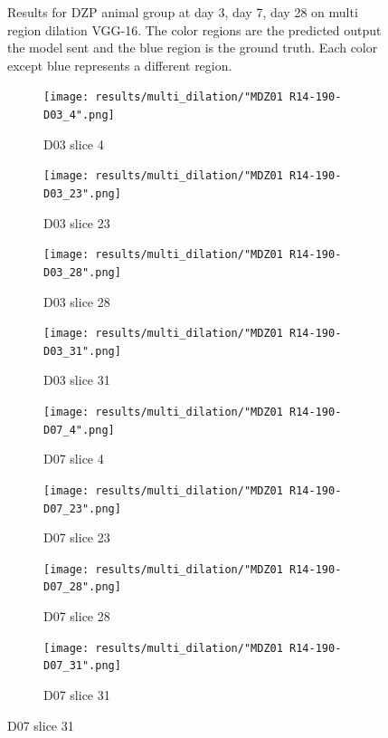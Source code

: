 \begin{figure}[!htb]
  \caption{Results for DZP animal group at day 3, day 7, day 28 on multi region dilation VGG-16. The color regions are the predicted output the model sent and the blue region is the ground truth. Each color except blue represents a different region.}
  \label{fig:results_multi_dilation_DZP}
\end{figure}


\begin{figure}[!htb]  
    \centering %
\begin{subfigure}{0.25\textwidth}
  \texttt{[image: results/multi\_dilation/"MDZ01 R14-190-D03\_4".png]}
  \caption{D03 slice 4}
\end{subfigure}\hfil %
\begin{subfigure}{0.25\textwidth}
  \texttt{[image: results/multi\_dilation/"MDZ01 R14-190-D03\_23".png]}
  \caption{D03 slice 23}
\end{subfigure}\hfil %
\begin{subfigure}{0.25\textwidth}
  \texttt{[image: results/multi\_dilation/"MDZ01 R14-190-D03\_28".png]}
  \caption{D03 slice 28}
\end{subfigure}\hfil %
\begin{subfigure}{0.25\textwidth}
  \texttt{[image: results/multi\_dilation/"MDZ01 R14-190-D03\_31".png]}
  \caption{D03 slice 31}
\end{subfigure}

\medskip
\begin{subfigure}{0.25\textwidth}
  \texttt{[image: results/multi\_dilation/"MDZ01 R14-190-D07\_4".png]}
  \caption{D07 slice 4}
\end{subfigure}\hfil %
\begin{subfigure}{0.25\textwidth}
  \texttt{[image: results/multi\_dilation/"MDZ01 R14-190-D07\_23".png]}
  \caption{D07 slice 23}
\end{subfigure}\hfil %
\begin{subfigure}{0.25\textwidth}
  \texttt{[image: results/multi\_dilation/"MDZ01 R14-190-D07\_28".png]}
  \caption{D07 slice 28}
\end{subfigure}\hfil %
\begin{subfigure}{0.25\textwidth}
  \texttt{[image: results/multi\_dilation/"MDZ01 R14-190-D07\_31".png]}
  \caption{D07 slice 31}
\end{subfigure}


\end{figure}
